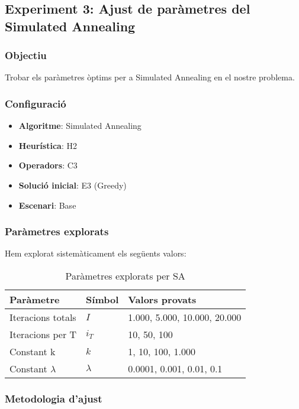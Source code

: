 
\subsection{Experiment 3: Ajust de paràmetres del Simulated Annealing}

\subsubsection{Objectiu}
Trobar els paràmetres òptims per a Simulated Annealing en el nostre problema.

\subsubsection{Configuració}
\begin{itemize}
    \item \textbf{Algoritme}: Simulated Annealing
    \item \textbf{Heurística}: H2
    \item \textbf{Operadors}: C3
    \item \textbf{Solució inicial}: E3 (Greedy)
    \item \textbf{Escenari}: Base
\end{itemize}

\subsubsection{Paràmetres explorats}

Hem explorat sistemàticament els següents valors:

\begin{table}[H]
\centering
\begin{tabular}{@{}lll@{}}
\toprule
\textbf{Paràmetre} & \textbf{Símbol} & \textbf{Valors provats} \\
\midrule
Iteracions totals & $I$ & 1.000, 5.000, 10.000, 20.000 \\
Iteracions per T & $i_T$ & 10, 50, 100 \\
Constant k & $k$ & 1, 10, 100, 1.000 \\
Constant $\lambda$ & $\lambda$ & 0.0001, 0.001, 0.01, 0.1 \\
\bottomrule
\end{tabular}
\caption{Paràmetres explorats per SA}
\label{tab:exp3-params}
\end{table}

\subsubsection{Metodologia d'ajust}

